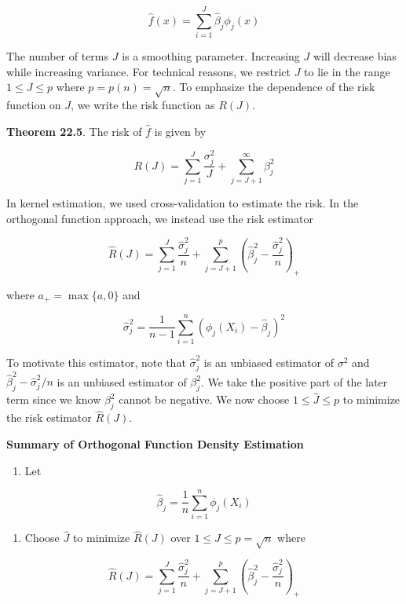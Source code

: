 \[ \hat{f}(x) = \sum_{i=1}^J \hat{\beta}_{j} \phi_{j}(x) \]

The number of terms \(J\) is a smoothing parameter. Increasing \(J\)
will decrease bias while increasing variance. For technical reasons, we
restrict \(J\) to lie in the range \(1 \leq J \leq p\) where
\(p = p(n) = \sqrt{n}\). To emphasize the dependence of the risk
function on \(J\), we write the risk function as \(R(J)\).

\textbf{Theorem 22.5}. The risk of \(\hat{f}\) is given by

\[ R(J) = \sum_{j=1}^J \frac{\sigma_{j}^{2}}{J} + \sum_{j=J+1}^{\infty} \beta_{j}^{2} \]

In kernel estimation, we used cross-validation to estimate the risk. In
the orthogonal function approach, we instead use the risk estimator

\[ \hat{R}(J) = \sum_{j=1}^J \frac{\hat{\sigma}_{j}^{2}}{n} + \sum_{j=J+1}^p \left( \hat{\beta}_{j}^{2} - \frac{\hat{\sigma}_{j}^{2}}{n} \right)_{+}\]

where \(a_{+} = \max \{ a, 0 \}\) and

\[ \hat{\sigma}_{j}^{2} = \frac{1}{n - 1} \sum_{i=1}^{n} \left( \phi_{j}(X_{i}) - \hat{\beta}_{j}\right)^{2} \]

To motivate this estimator, note that \(\hat{\sigma}_{j}^{2}\) is an
unbiased estimator of \(\sigma^{2}\) and
\(\hat{\beta}_{j}^{2} - \hat{\sigma}_{j}^{2} / n\) is an unbiased estimator of
\(\beta_{j}^{2}\). We take the positive part of the later term since we know
\(\beta_{j}^{2}\) cannot be negative. We now choose
\(1 \leq \hat{J} \leq p\) to minimize the risk estimator \(\hat{R}(J)\).

\textbf{Summary of Orthogonal Function Density Estimation}

\begin{enumerate}[tightlist,label={\arabic*.}]
\item
  Let
\end{enumerate}

\[ \hat{\beta}_{j} = \frac{1}{n} \sum_{i=1}^{n} \phi_{j}(X_{i}) \]

\begin{enumerate}[tightlist,label={\arabic*.}]
\item
  Choose \(\hat{J}\) to minimize \(\hat{R}(J)\) over
  \(1 \leq J \leq p = \sqrt{n}\) where
\end{enumerate}

\[ \hat{R}(J) = \sum_{j=1}^J \frac{\hat{\sigma}_{j}^{2}}{n} + \sum_{j=J+1}^p \left( \hat{\beta}_{j}^{2} - \frac{\hat{\sigma}_{j}^{2}}{n} \right)_{+}\]

